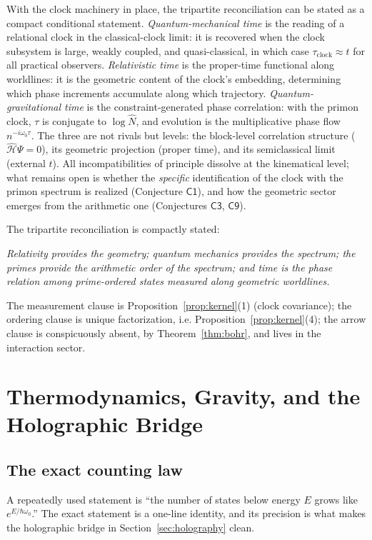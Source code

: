 \documentclass[11pt,a4paper]{article}
\theoremstyle{plain}
\theoremstyle{definition}
\theoremstyle{remark}
\newcommand{\Nhat}{\widehat{N}}
\newcommand{\Hmax}{\widehat{\mathcal{H}}}
\begin{document}
With the clock machinery in place, the tripartite reconciliation can be stated as
a compact conditional statement. \emph{Quantum-mechanical time} is the reading of a
relational clock in the classical-clock limit: it is recovered when the clock subsystem is
large, weakly coupled, and quasi-classical, in which case $\tau_{\mathrm{clock}}\approx t$
for all practical observers. \emph{Relativistic time} is the proper-time functional along
worldlines: it is the geometric content of the clock's embedding, determining which phase
increments accumulate along which trajectory. \emph{Quantum-gravitational time} is the
constraint-generated phase correlation: with the primon clock, $\tau$ is conjugate to
$\log\Nhat$, and evolution is the multiplicative phase flow
$n^{-i\omega_{0}\tau}$. The three are not rivals but levels: the block-level correlation
structure ($\Hmax\Psi=0$), its geometric projection (proper time), and its semiclassical
limit (external $t$). All incompatibilities of principle dissolve at the kinematical level;
what remains open
is whether the \emph{specific} identification of the clock with the
primon spectrum is realized (Conjecture $\mathsf{C1}$), and how the geometric sector
emerges from the arithmetic one (Conjectures $\mathsf{C3}$, $\mathsf{C9}$).

The tripartite reconciliation is compactly stated:
\begin{center}
\emph{Relativity provides the geometry; quantum mechanics provides the spectrum; the primes
provide the arithmetic order of the spectrum; and time is the phase relation among
prime-ordered states measured along geometric worldlines.}
\end{center}
The measurement clause is Proposition~\ref{prop:kernel}(1) (clock covariance); the ordering
clause is unique factorization, i.e. Proposition~\ref{prop:kernel}(4); the arrow clause is
conspicuously absent, by Theorem~\ref{thm:bohr}, and lives in the interaction sector.

\section{Thermodynamics, Gravity, and the Holographic Bridge}\label{sec:thermo}

\subsection{The exact counting law}

A repeatedly used statement is ``the number of states below energy $E$ grows like
$e^{E/\hbar\omega_{0}}$.'' The exact statement is a one-line identity, and its precision is
what makes the holographic bridge in Section~\ref{sec:holography} clean.
\end{document}
